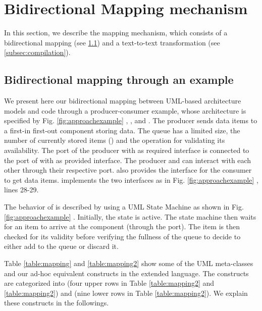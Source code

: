 \section{Bidirectional Mapping mechanism}
\label{sec:mappingmechanism}
In this section, we describe the mapping mechanism, which consists of a bidirectional mapping (see \ref{subsec:bimapping}) and a text-to-text transformation (see \ref{subsec:compilation}).

\subsection{Bidirectional mapping through an example}
\label{subsec:bimapping}
We present here our bidirectional mapping between UML-based architecture models and code through a producer-consumer example, whose architecture is specified by Fig. \ref{fig:approachexample} , , and .
The  producer sends data items to a first-in first-out component  storing data.
The  queue has a limited size, the number of currently stored items () and the  operation for validating its availability.
The  port of the producer with  as required interface is connected to the  port of  with  as provided interface. 
The producer and  can interact with each other through their respective port.
 also provides the  interface for the consumer to get data items.
 implements the two interfaces as in Fig. \ref{fig:approachexample} , lines 28-29.

The behavior of  is described by using a UML State Machine as shown in Fig. \ref{fig:approachexample} .
Initially, the  state is active.
The state machine then waits for an item to arrive at the  component (through the  port).
The item is then checked for its validity before verifying the fullness of the queue to decide to either add to the queue or discard it.


Table \ref{table:mapping} and \ref{table:mapping2} show some of the UML meta-classes and our ad-hoc equivalent constructs in the extended language.
The constructs are categorized into  (four upper rows in Table \ref{table:mapping2} and \ref{table:mapping2}) and  (nine lower rows in Table \ref{table:mapping2}).
We explain these constructs in the followings.



